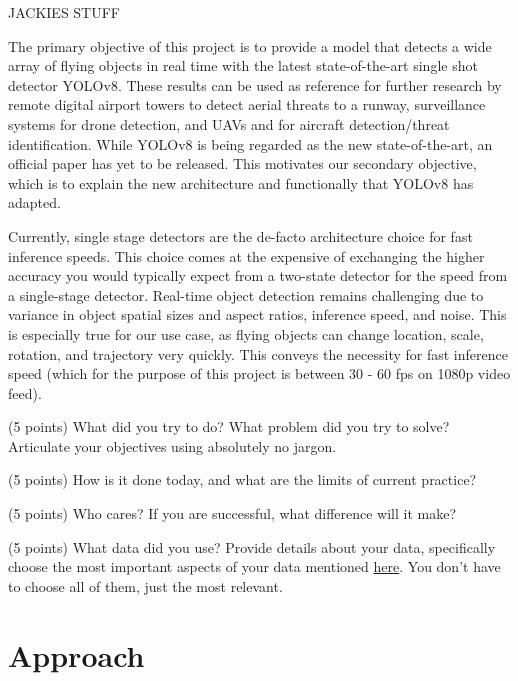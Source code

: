 \documentclass[10pt,twocolumn,letterpaper]{article}
\begin{document}
JACKIES STUFF
 

The primary objective of this project is to provide a model that detects a wide array of flying objects in real time with the latest 
state-of-the-art single shot detector YOLOv8. These results can be used as reference for further research by remote digital airport 
towers to detect aerial threats to a runway, surveillance systems for drone detection, and UAVs and for aircraft detection/threat identification. 
While YOLOv8 is being regarded as the new state-of-the-art, an official paper has yet to be released. This motivates our secondary objective, 
which is to explain the new architecture and functionally that YOLOv8 has adapted.

Currently, single stage detectors are the de-facto architecture choice for fast inference speeds. This choice comes at the expensive of exchanging 
the higher accuracy you would typically expect from a two-state detector for the speed from a single-stage detector. Real-time object detection 
remains challenging due to variance in object spatial sizes and aspect ratios, inference speed, and noise. This is especially true for our use 
case, as flying objects can change location, scale, rotation, and trajectory very quickly. This conveys the necessity for fast inference speed 
(which for the purpose of this project is between 30 - 60 fps on 1080p video feed). 

(5 points) What did you try to do? What problem did you try to solve? Articulate your objectives using absolutely no jargon. 

(5 points) How is it done today, and what are the limits of current practice?

(5 points) Who cares? If you are successful, what difference will it make? 

(5 points) What data did you use? Provide details about your data, specifically choose the most important aspects of your data mentioned \href{https://arxiv.org/abs/1803.09010}{here}. You don’t have to choose all of them, just the most relevant.
\section{Approach}
\end{document}
